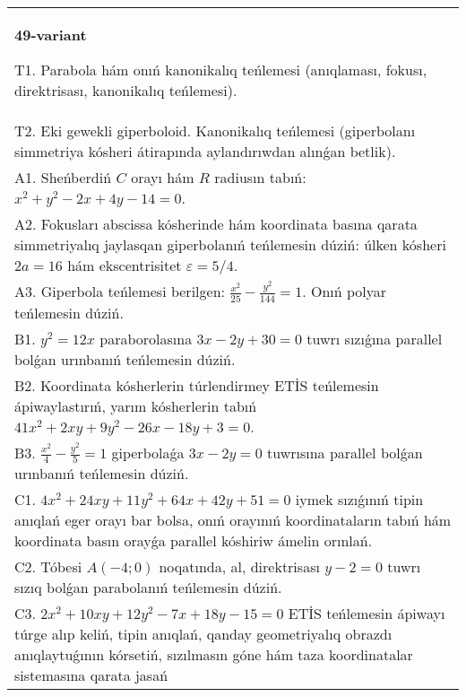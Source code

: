 \documentclass{article}
\begin{document}
\begin{tabular}{m{17cm}}
\textbf{49-variant}
\newline

T1. Parabola hám onıń kanonikalıq teńlemesi (anıqlaması, fokusı, direktrisası, kanonikalıq teńlemesi).\\

T2. Eki gewekli giperboloid. Kanonikalıq teńlemesi (giperbolanı simmetriya kósheri átirapında aylandırıwdan alınǵan betlik).\\

A1. Sheńberdiń $C$ orayı hám $R$ radiusın tabıń: $x^2+y^2-2 x+4 y-14=0$.\\

A2. Fokusları abscissa kósherinde hám koordinata basına qarata simmetriyalıq jaylasqan giperbolanıń teńlemesin dúziń: úlken kósheri $2 a=16$ hám ekscentrisitet $\varepsilon=5/4$.\\

A3. Giperbola teńlemesi berilgen: $\frac{x^{2}}{25}-\frac{y^{2}}{144}=1$. Onıń polyar teńlemesin dúziń.\\

B1. $y^{2} = 12x$ paraborolasına $3x - 2y + 30 = 0$ tuwrı sızıǵına parallel bolǵan urınbanıń teńlemesin dúziń.  \\

B2. Koordinata kósherlerin túrlendirmey ETİS teńlemesin ápiwaylastırıń, yarım kósherlerin tabıń $41x^{2} + 2xy + 9y^{2} - 26x - 18y + 3 = 0$.  \\

B3. $\frac{x^{2}}{4} - \frac{y^{2}}{5} = 1$ giperbolaǵa $3x - 2y = 0$ tuwrısına parallel bolǵan urınbanıń teńlemesin dúziń.  \\

C1. $4x^{2} + 24xy + 11y^{2} + 64x + 42y + 51 = 0$ iymek sızıǵınıń tipin anıqlań eger orayı bar bolsa, onıń orayınıń koordinataların tabıń hám koordinata basın orayǵa parallel kóshiriw ámelin orınlań.  \\

C2. Tóbesi $A(-4;0)$ noqatında, al, direktrisası $y - 2 = 0$ tuwrı sızıq bolǵan parabolanıń teńlemesin dúziń.\\

C3. $2x^{2} + 10xy + 12y^{2} - 7x + 18y - 15 = 0$ ETİS teńlemesin ápiwayı túrge alıp keliń, tipin anıqlań, qanday geometriyalıq obrazdı anıqlaytuǵının kórsetiń, sızılmasın góne hám taza koordinatalar sistemasına qarata jasań  \\

\end{tabular}
\vspace{1cm}
\end{document}
